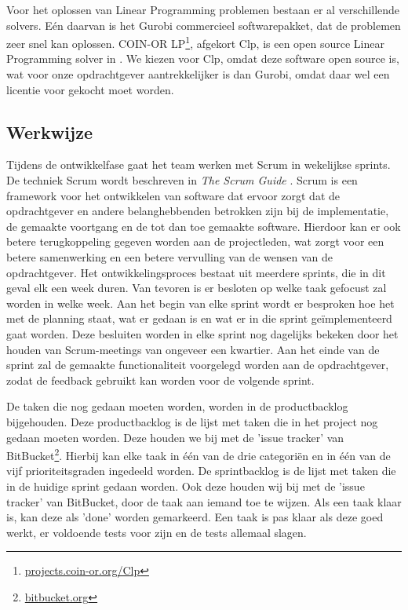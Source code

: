 Voor het oplossen van Linear Programming problemen bestaan er al verschillende solvers. E\'en daarvan is het Gurobi commercieel softwarepakket, dat de problemen zeer snel kan oplossen. COIN-OR LP\footnote{\href{http://projects.coin-or.org/Clp}{projects.coin-or.org/Clp}}, afgekort Clp, is een open source Linear Programming solver in \cpp . We kiezen voor Clp, omdat deze software open source is, wat voor onze opdrachtgever aantrekkelijker is dan Gurobi, omdat daar wel een licentie voor gekocht moet worden.

\subsection{Werkwijze}
Tijdens de ontwikkelfase gaat het team werken met Scrum in wekelijkse sprints. De techniek Scrum wordt beschreven in \emph{The Scrum Guide} \cite{schwaber2011}. Scrum is een framework voor het ontwikkelen van software dat ervoor zorgt dat de opdrachtgever en andere belanghebbenden betrokken zijn bij de implementatie, de gemaakte voortgang en de tot dan toe gemaakte software. Hierdoor kan er ook betere terugkoppeling gegeven worden aan de projectleden, wat zorgt voor een betere samenwerking en een betere vervulling van de wensen van de opdrachtgever. Het ontwikkelingsproces bestaat uit meerdere sprints, die in dit geval elk een week duren. Van tevoren is er besloten op welke taak gefocust zal worden in welke week. Aan het begin van elke sprint wordt er besproken hoe het met de planning staat, wat er gedaan is en wat er in die sprint ge\"implementeerd gaat worden. Deze besluiten worden in elke sprint nog dagelijks bekeken door het houden van Scrum-meetings van ongeveer een kwartier. Aan het einde van de sprint zal de gemaakte functionaliteit voorgelegd worden aan de opdrachtgever, zodat de feedback gebruikt kan worden voor de volgende sprint. 

De taken die nog gedaan moeten worden, worden in de productbacklog bijgehouden. Deze productbacklog is de lijst met taken die in het project nog gedaan moeten worden. Deze houden we bij met de 'issue tracker' van BitBucket\footnote{\href{http://bitbucket.org}{bitbucket.org}}. Hierbij kan elke taak in \'e\'en van de drie categori\"en en in \'e\'en van de vijf prioriteitsgraden ingedeeld worden. De sprintbacklog is de lijst met taken die in de huidige sprint gedaan worden. Ook deze houden wij bij met de 'issue tracker' van BitBucket, door de taak aan iemand toe te wijzen. Als een taak klaar is, kan deze als 'done' worden gemarkeerd. Een taak is pas klaar als deze goed werkt, er voldoende tests voor zijn en de tests allemaal slagen.

